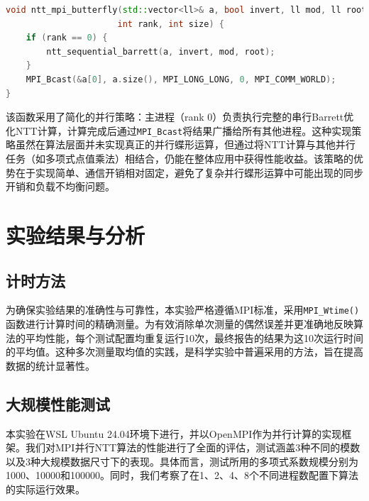 \documentclass[a4paper]{article}
\begin{document}
\begin{lstlisting}[title=MPI并行NTT实现,frame=trbl,language={C++}]
void ntt_mpi_butterfly(std::vector<ll>& a, bool invert, ll mod, ll root, 
                      int rank, int size) {
    if (rank == 0) {
        ntt_sequential_barrett(a, invert, mod, root);
    }
    MPI_Bcast(&a[0], a.size(), MPI_LONG_LONG, 0, MPI_COMM_WORLD);
}
\end{lstlisting}
该函数采用了简化的并行策略：主进程（rank 0）负责执行完整的串行Barrett优化NTT计算，计算完成后通过\texttt{MPI\_Bcast}将结果广播给所有其他进程。这种实现策略虽然在算法层面并未实现真正的并行蝶形运算，但通过将NTT计算与其他并行任务（如多项式点值乘法）相结合，仍能在整体应用中获得性能收益。该策略的优势在于实现简单、通信开销相对固定，避免了复杂并行蝶形运算中可能出现的同步开销和负载不均衡问题。

\section{实验结果与分析}

\subsection{计时方法}

为确保实验结果的准确性与可靠性，本实验严格遵循MPI标准，采用\texttt{MPI\_Wtime()}函数进行计算时间的精确测量。为有效消除单次测量的偶然误差并更准确地反映算法的平均性能，每个测试配置均重复运行10次，最终报告的结果为这10次运行时间的平均值。这种多次测量取均值的实践，是科学实验中普遍采用的方法，旨在提高数据的统计显著性。

\subsection{大规模性能测试}

本实验在WSL Ubuntu 24.04环境下进行，并以OpenMPI作为并行计算的实现框架。我们对MPI并行NTT算法的性能进行了全面的评估，测试涵盖3种不同的模数以及3种大规模数据尺寸下的表现。具体而言，测试所用的多项式系数规模分别为1000、10000和100000。同时，我们考察了在1、2、4、8个不同进程数配置下算法的实际运行效果。
\end{document}
